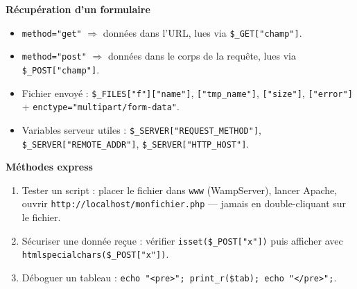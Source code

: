 \documentclass[11pt]{article}
\begin{document}
\begin{bilan}
\textbf{Récupération d'un formulaire}
\begin{itemize}
  \item \texttt{method="get"} $\Rightarrow$ données dans l'URL, lues via \texttt{\$\_GET["champ"]}.
  \item \texttt{method="post"} $\Rightarrow$ données dans le corps de la requête, lues via \texttt{\$\_POST["champ"]}.
  \item Fichier envoyé : \texttt{\$\_FILES["f"]["name"]}, \texttt{["tmp\_name"]}, \texttt{["size"]}, \texttt{["error"]} + \texttt{enctype="multipart/form-data"}.
  \item Variables serveur utiles : \texttt{\$\_SERVER["REQUEST\_METHOD"]}, \texttt{\$\_SERVER["REMOTE\_ADDR"]}, \texttt{\$\_SERVER["HTTP\_HOST"]}.
\end{itemize}

\textbf{Méthodes express}
\begin{enumerate}
  \item Tester un script : placer le fichier dans \texttt{www} (WampServer), lancer Apache, ouvrir \texttt{http://localhost/monfichier.php} — jamais en double-cliquant sur le fichier.
  \item Sécuriser une donnée reçue : vérifier \texttt{isset(\$\_POST["x"])} puis afficher avec \texttt{htmlspecialchars(\$\_POST["x"])}.
  \item Déboguer un tableau : \texttt{echo "<pre>"; print\_r(\$tab); echo "</pre>";}.
\end{enumerate}
\end{bilan}
\end{document}
